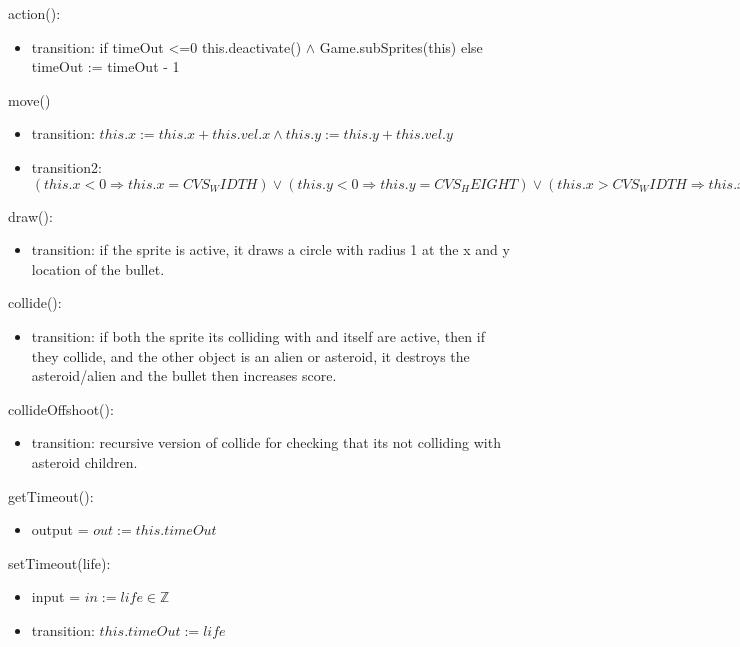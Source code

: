 \documentclass[12pt]{article}
\begin{document}
action():
\begin{itemize}
    \item transition: if timeOut <=0 \Rightarrow this.deactivate() $\land$ Game.subSprites(this) else timeOut := timeOut - 1
\end{itemize}

move()
\begin{itemize}
    \item transition: $this.x := this.x + this.vel.x \land this.y := this.y + this.vel.y$
    \item transition2: $(this.x < 0 \Rightarrow this.x = CVS_WIDTH) \lor (this.y < 0 \Rightarrow this.y = CVS_HEIGHT) \lor (this.x > CVS_WIDTH \Rightarrow this.x = 0) \lor (this.y > CVS_HEIGHT \Rightarrow this.y = 0)$
\end{itemize}

draw():
\begin{itemize}
    \item transition: if the sprite is active, it draws a circle with radius 1 at the x and y location of the bullet.
\end{itemize}

collide():
\begin{itemize}
    \item transition: if both the sprite its colliding with and itself are active, then if they collide, and the other object is an alien or asteroid, it destroys the asteroid/alien and the bullet then increases score.
\end{itemize}

collideOffshoot():
\begin{itemize}
    \item transition: recursive version of collide for checking that its not colliding with asteroid children.
\end{itemize}
\newpage

getTimeout():
\begin{itemize}
    \item output = $out := this.timeOut$
\end{itemize}

setTimeout(life):
\begin{itemize}
    \item input = $in := life \in \mathbb{Z}$
    \item transition: $this.timeOut := life$
\end{itemize}

\newpage 
\end{document}
